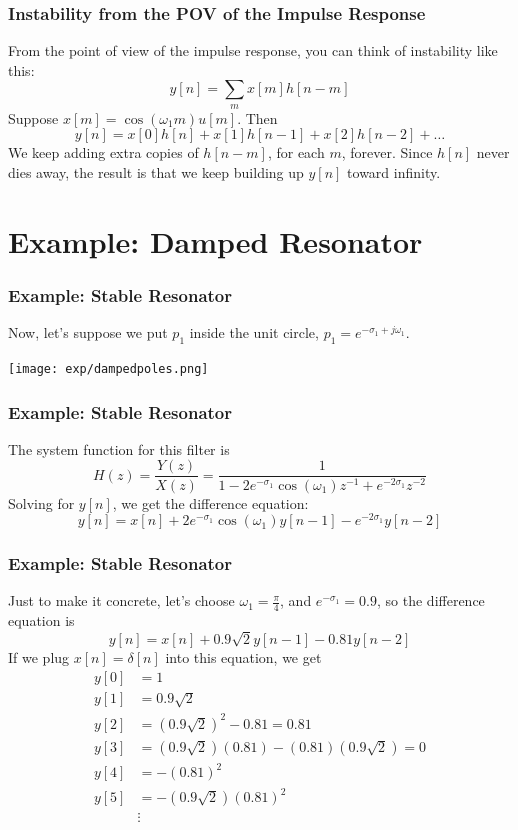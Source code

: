 \documentclass{beamer}
\begin{document}
\begin{frame}
  \centerline{}
\end{frame}

\begin{frame}
  \frametitle{Instability from the POV of the Impulse Response}
  From the point of view of the impulse response, you can think of instability like this:
  \[
  y[n] = \sum_m x[m]h[n-m]
  \]
  Suppose $x[m] = \cos(\omega_1 m)u[m]$.   Then
  \[
  y[n] = x[0]h[n] + x[1]h[n-1] + x[2]h[n-2] + \ldots
  \]
  We keep adding extra copies of $h[n-m]$, for each $m$, forever.
  Since $h[n]$ never dies away, the result is that we keep building up
  $y[n]$ toward infinity.
\end{frame}

\begin{frame}
  \centerline{}
\end{frame}
  
\section[Damped]{Example: Damped Resonator}
\setcounter{subsection}{1}

\begin{frame}
  \frametitle{Example: Stable Resonator}

  Now, let's suppose we put $p_1$ inside the unit
  circle, $p_1=e^{-\sigma_1+j\omega_1}$.

  \centerline{\texttt{[image: exp/dampedpoles.png]}}
\end{frame}

\begin{frame}
  \frametitle{Example: Stable Resonator}

  The system function for this filter is
  \[
  H(z) = \frac{Y(z)}{X(z)} = \frac{1}{1-2e^{-\sigma_1}\cos(\omega_1) z^{-1} + e^{-2\sigma_1}z^{-2}}
  \]
  Solving for $y[n]$, we get the difference equation:
  \[
  y[n] = x[n] + 2e^{-\sigma_1}\cos(\omega_1) y[n-1] - e^{-2\sigma_1}y[n-2]
  \]
\end{frame}

\begin{frame}
  \frametitle{Example: Stable Resonator}

  Just to make it concrete, let's choose $\omega_1=\frac{\pi}{4}$, and
  $e^{-\sigma_1}=0.9$, so the difference equation is
  \[
  y[n] = x[n] + 0.9\sqrt{2} y[n-1] - 0.81 y[n-2]
  \]
  If we plug $x[n]=\delta[n]$ into this equation, we get
  \begin{align*}
    y[0] &= 1\\
    y[1] &= 0.9\sqrt{2}\\
    y[2] &= (0.9\sqrt{2})^2 - 0.81 = 0.81\\
    y[3] &= (0.9\sqrt{2})(0.81)-(0.81)(0.9\sqrt{2})=0\\
    y[4] &= -(0.81)^2\\
    y[5] &= -(0.9\sqrt{2})(0.81)^2\\
    &\vdots
  \end{align*}
\end{frame}
\end{document}
